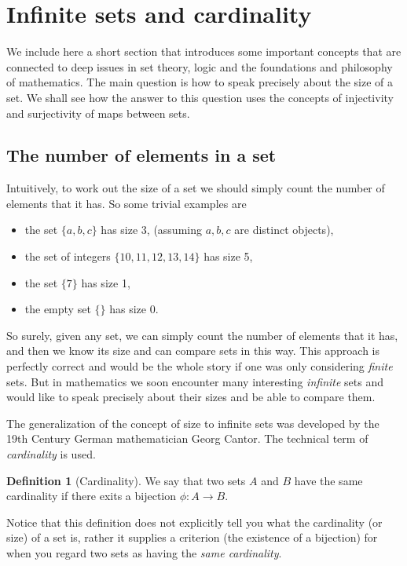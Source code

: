 \documentclass[extrafontsizes, twoside, a4paper]{memoir}
\theoremstyle{plain}%
\theoremstyle{definition}
\newtheorem{defn}{Definition}[chapter]
\theoremstyle{remark}
\begin{document}
\section{Infinite sets and cardinality}
We include here a short section that introduces some important concepts that are connected to deep issues in set theory,
 logic and the foundations and philosophy of mathematics. The main question is how to speak precisely about the size of a set. We shall see how the answer to this question uses the concepts of injectivity and surjectivity of maps between sets.

\subsection*{The number of elements in a set}
Intuitively, to work out the size of a set we should simply count the number of elements that it has. So some trivial examples are
\begin{itemize}
\item
the set $\{ a, b, c \}$ has size 3, (assuming $a,b,c$ are distinct objects),
\item
the set of integers $\{ 10, 11, 12, 13, 14 \}$ has size 5,
\item
the set $\{ 7\}$ has size 1,
\item
the empty set $\{  \}$ has size 0.
\end{itemize}
So surely, given any set, we can simply count the number of elements that it has, and then we know its size and can compare sets in this way. This approach is perfectly correct and would be the whole story if one was only considering \emph{finite} sets. But in mathematics we soon encounter many interesting \emph{infinite} sets and would like to speak precisely about their sizes and be able to compare them.

The generalization of the concept of size to infinite sets was developed by the 19th Century German mathematician Georg Cantor. The technical term of \emph{cardinality} is used.

\begin{defn}[Cardinality]
We say that two sets $A$ and $B$ have the same cardinality if there exits a bijection $\phi : A \to B$.
\end{defn}
Notice that this definition does not explicitly tell you what the cardinality (or size) of a set is, rather it supplies a criterion (the existence of a bijection) for when you regard two sets as having the \emph{same cardinality}.
\end{document}
